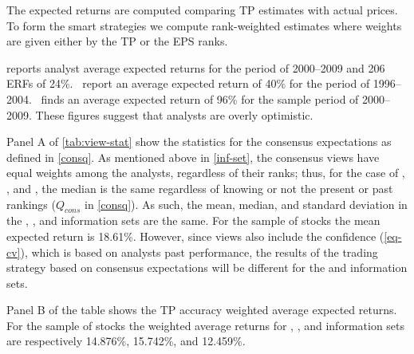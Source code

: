 \documentclass[a4paper,twoside,12pt,openright,notitlepage]{report}\usepackage[]{graphicx}\usepackage[]{color}
\begin{document}
The expected returns  are computed comparing TP estimates with actual prices. To form the smart strategies we compute rank-weighted estimates where weights are given either by the TP or the EPS ranks.

\cite{bradshaw2002} reports analyst average expected returns for the period of 2000--2009 and 206 ERFs of 24\%.~\cite{da2011} report an average expected return of 40\% for the period of 1996--2004.~\cite{zhou2013} finds an average expected return of 96\% for the sample period of 2000--2009. These figures suggest that analysts are overly optimistic.

Panel A of \ref{tab:view-stat} show the statistics for the consensus expectations as defined in \ref{consq}. As mentioned above in \ref{inf-set}, the consensus views have equal weights among the analysts, regardless of their ranks; thus, for the case of \tr{}, \naive{}, and , the median is the same regardless of knowing or not the present or past rankings ($Q_{cons}$ in  \ref{consq}). As such, the mean, median, and standard deviation in the \tr{}, \naive{}, and  information sets are the same. For the sample of \all{} stocks the mean expected return is 18.61\%. However, since views also include the confidence (\ref{eq-cv}), which is based on analysts past performance, the results of the trading strategy based on consensus expectations will be different for the \naive{} and  information sets.


Panel B of the table shows the TP accuracy weighted average expected returns. For the sample of \all{} stocks the weighted average returns for \tr{}, \naive{}, and  information sets are respectively 14.876\%, 15.742\%, and 12.459\%.

\end{document}

